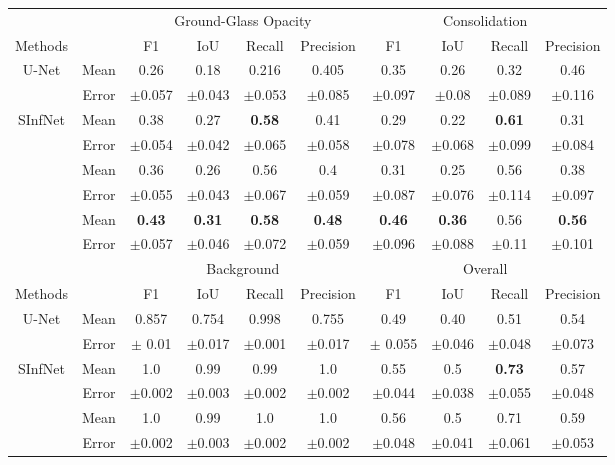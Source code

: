  \begin{table}[!h]
 	\centering
 	\small
 	\begin{tabular}{| c | c || c c c c || c c c c |}
 		\hline
 		& &\multicolumn{4}{c||}{Ground-Glass Opacity} & \multicolumn{4}{c|}{Consolidation}\\ \cline{3-10}
 		Methods & & F1 & IoU & Recall & Precision & F1 & IoU & Recall & Precision \\\hline
 		U-Net & Mean & 0.26 & 0.18 & 0.216 & 0.405 & 0.35 & 0.26 & 0.32 & 0.46 \\ \cline{2-10}
 		& Error & $\pm$0.057 & $\pm$0.043 & $\pm$0.053 & $\pm$0.085 & $\pm$0.097 & $\pm$0.08 & $\pm$0.089 & $\pm$0.116  \\ \hline
 		SInfNet & Mean & 0.38 & 0.27 & \textbf{0.58} & 0.41 & 0.29 & 0.22 & \textbf{0.61} & 0.31  \\ \cline{2-10}
 		& Error & $\pm$0.054 & $\pm$0.042 & $\pm$0.065 & $\pm$0.058 & $\pm$0.078 & $\pm$0.068 & $\pm$0.099 & $\pm$0.084  \\ \hline \hline
 		
 		\vtop{\hbox{\strut SSInfNet}\hbox{\strut }} & Mean & 0.36 & 0.26 & 0.56 & 0.4 & 0.31 & 0.25 & 0.56 & 0.38 \\ \cline{2-10}
 		& Error & $\pm$0.055 & $\pm$0.043 & $\pm$0.067 & $\pm$0.059 & $\pm$0.087 & $\pm$0.076 & $\pm$0.114 & $\pm$0.097 \\ \hline \hline
 		
 		\vtop{\hbox{\strut SSInfNet+}\hbox{\strut focal loss+}\hbox{\strut lookahead}} & Mean & \textbf{0.43} & \textbf{0.31} & \textbf{0.58} & \textbf{0.48} & \textbf{0.46} & \textbf{0.36} & 0.56 & \textbf{0.56} \\ \cline{2-10}
 		& Error & $\pm$0.057 & $\pm$0.046 & $\pm$0.072 & $\pm$0.059 & $\pm$0.096 & $\pm$0.088 & $\pm$0.11 & $\pm$0.101 \\ \hline \hline \hline
 		
 		
 		& &\multicolumn{4}{c||}{Background} & \multicolumn{4}{c|}{Overall}\\ \cline{3-10}
 		Methods & & F1 & IoU & Recall & Precision & F1 & IoU & Recall & Precision \\\hline
 		U-Net & Mean & 0.857 & 0.754 & 0.998 & 0.755 &  0.49 & 0.40 & 0.51 & 0.54  \\ \cline{2-10}
 		& Error &  $\pm$ 0.01 & $\pm$0.017 & $\pm$0.001 & $\pm$0.017 & $\pm$ 0.055 & $\pm$0.046 & $\pm$0.048 & $\pm$0.073 \\ \hline
 		SInfNet & Mean & 1.0 & 0.99 & 0.99 & 1.0 & 0.55 & 0.5 & \textbf{0.73} & 0.57   \\ \cline{2-10}
 		& Error & $\pm$0.002 & $\pm$0.003 & $\pm$0.002 & $\pm$0.002 & $\pm$0.044 & $\pm$0.038 & $\pm$0.055 & $\pm$0.048 \\ \hline
 		\vtop{\hbox{\strut SSInfNet}\hbox{\strut }} & Mean & 1.0 & 0.99 & 1.0 & 1.0 & 0.56 & 0.5 & 0.71 & 0.59 \\ \cline{2-10}
 		& Error & $\pm$0.002 & $\pm$0.003 & $\pm$0.002 & $\pm$0.002 & $\pm$0.048 & $\pm$0.041 & $\pm$0.061 & $\pm$0.053\\ \hline \hline


\end{tabular}
\end{table}
